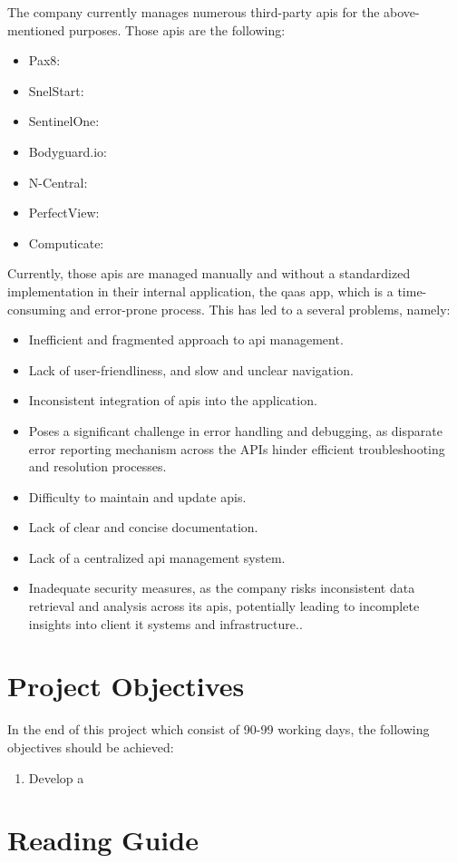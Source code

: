 \begin{multicols}{2}
    The company currently manages numerous third-party \acrshort{api}s for the above-mentioned purposes. Those
    \acrshort{api}s are the following:
    \begin{itemize}
        \item Pax8:
        \item SnelStart:
        \item SentinelOne:
        \item Bodyguard.io:
        \item N-Central:
        \item PerfectView:
        \item Computicate:
    \end{itemize}
    Currently, those \acrshort{api}s are managed manually and without a standardized implementation in their
    internal application, the \acrshort{qaas} app, which is a time-consuming and error-prone process. This has
    led to a several problems, namely:
    \begin{itemize}
        \item Inefficient and fragmented approach to \acrshort{api} management.
        \item Lack of user-friendliness, and slow and unclear navigation.
        \item Inconsistent integration of \acrshort{api}s into the application.
        \item Poses a significant challenge in error handling and debugging, as disparate error reporting mechanism
              across the APIs hinder efficient troubleshooting and resolution processes.
        \item Difficulty to maintain and update \acrshort{api}s.
        \item Lack of clear and concise documentation.
        \item Lack of a centralized \acrshort{api} management system.
        \item Inadequate security measures, as the company risks inconsistent data retrieval and analysis across its \acrshort{api}s,
              potentially leading to incomplete insights into client \acrshort{it} systems and infrastructure..
    \end{itemize}

    \section{Project Objectives}
    In the end of this project which consist of 90-99 working days, the following objectives should be achieved:
    \begin{enumerate}
        \item Develop a
    \end{enumerate}
    \section{Reading Guide}

\end{multicols}